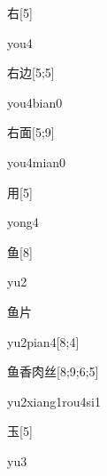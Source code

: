 \begin{verbete}[you4]{右}[5]
\begin{pronuncia}{you4}
\end{pronuncia}
\end{verbete}

\begin{verbete}{右边}[5;5]
\begin{pronuncia}{you4bian0}
\end{pronuncia}
\end{verbete}

\begin{verbete}{右面}[5;9]
\begin{pronuncia}{you4mian0}
\end{pronuncia}
\end{verbete}

\begin{verbete}[yong4]{用}[5]
\begin{pronuncia}{yong4}
\end{pronuncia}
\end{verbete}

\begin{verbete}[yu2]{鱼}[8]
\begin{pronuncia}{yu2}
\end{pronuncia}
\end{verbete}

\begin{verbete}[yu2pian4]{鱼片}
\begin{pronuncia}{yu2pian4}[8;4]
\end{pronuncia}
\end{verbete}

\begin{verbete}{鱼香肉丝}[8;9;6;5]
\begin{pronuncia}{yu2xiang1rou4si1}
\end{pronuncia}
\end{verbete}

\begin{verbete}[yu3]{玉}[5]
\begin{pronuncia}{yu3}
\end{pronuncia}
\end{verbete}


